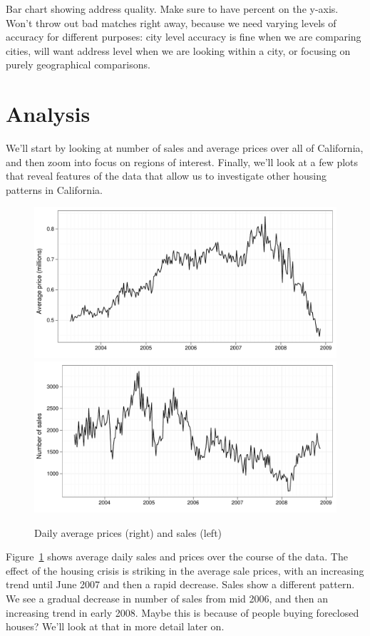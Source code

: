 \documentclass[oneside]{article}
\begin{document}
Bar chart showing address quality.  Make sure to have percent on the y-axis.  Won't throw out bad matches right away, because we need varying levels of accuracy for different purposes: city level accuracy is fine when we are comparing cities, will want address level when we are looking within a city, or focusing on purely geographical comparisons.



\section{Analysis}

We'll start by looking at number of sales and average prices over all of California, and then zoom into focus on regions of interest.  Finally, we'll look at a few plots that reveal features of the data that allow us to investigate other housing patterns in California.

\begin{figure}[htbp]
  \centering
    \includegraphics[width=0.5 \linewidth]{daily-price}%
    \includegraphics[width=0.5 \linewidth]{daily-sales}
  \caption{Daily average prices (right) and sales (left)}
  \label{fig:daily}
\end{figure}

Figure~\ref{fig:daily} shows average daily sales and prices over the course of the data.  The effect of the housing crisis is striking in the average sale prices, with an increasing trend until June 2007 and then a rapid decrease.  Sales show a different pattern.  We see a gradual decrease in number of sales from mid 2006, and then an increasing trend in early 2008. Maybe this is because of people buying foreclosed houses?  We'll look at that in more detail later on.
\end{document}
